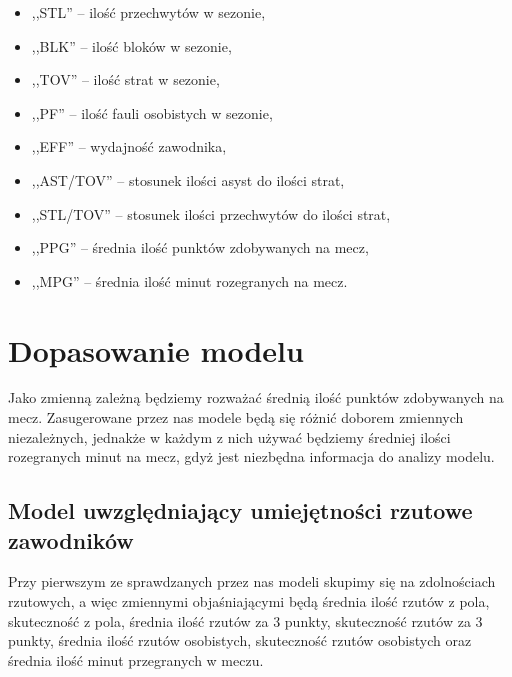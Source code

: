 \documentclass[11pt,a4paper]{article}
\begin{document}
\begin{itemize}
	\item ,,STL'' -- ilość przechwytów w sezonie,
	\item ,,BLK'' -- ilość bloków w sezonie,
	\item ,,TOV'' -- ilość strat w sezonie,
	\item ,,PF'' -- ilość fauli osobistych w sezonie,
	\item ,,EFF'' -- wydajność zawodnika,
	\item ,,AST/TOV'' -- stosunek ilości asyst do ilości strat,
	\item ,,STL/TOV'' -- stosunek ilości przechwytów do ilości strat,
	\item ,,PPG'' -- średnia ilość punktów zdobywanych na mecz,
	\item ,,MPG'' -- średnia ilość minut rozegranych na mecz.
\end{itemize}
	
\section{Dopasowanie modelu}
Jako zmienną zależną będziemy rozważać średnią ilość punktów zdobywanych na mecz. Zasugerowane przez nas modele będą się różnić doborem zmiennych niezależnych, jednakże w każdym z nich używać będziemy średniej ilości rozegranych minut na mecz, gdyż jest niezbędna informacja do analizy modelu. 

\subsection{Model uwzględniający umiejętności rzutowe zawodników}
Przy pierwszym ze sprawdzanych przez nas modeli skupimy się na zdolnościach rzutowych, a więc zmiennymi objaśniającymi będą średnia ilość rzutów z pola, skuteczność z pola, średnia ilość rzutów za 3 punkty, skuteczność rzutów za 3 punkty, średnia ilość rzutów osobistych, skuteczność rzutów osobistych oraz średnia ilość minut przegranych w meczu.
\end{document}
